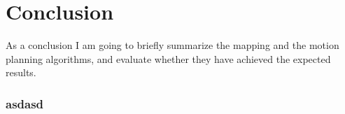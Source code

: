 \chapter{Conclusion}
\label{chap:conclusion}

As a conclusion I am going to briefly summarize the mapping and the motion planning algorithms, and evaluate whether they have achieved the expected results.

\subsection{asdasd}
